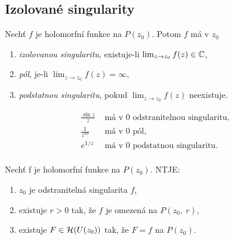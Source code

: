 \subsection{Izolované singularity}
\begin{definition}
Nechť $f$ je holomorfní funkce na $P(z_0)$. Potom $f$ má v $z_0$
\begin{enumerate}
    \item \emph{izolovanou singularitu}, existuje-li $\lim_{z\rightarrow z_0}f(z)\in\operatorname{\mathbb{C}}$,
    \item \emph{pól}, je-li $\lim_{z\rightarrow z_0}f(z)=\infty$,
    \item \emph{podstatnou singularitu}, pokud $\lim_{z\rightarrow z_0}f(z)$ neexistuje.
\end{enumerate}
\end{definition}
\begin{example}
\begin{align*}
     \frac{\sin{z}}{z}& \text{ má v 0 odstranitelnou singularitu,}\\
     \frac{1}{z^{10}}& \text{ má v 0 pól,}\\
     e^{1/z}& \text{ má v 0 podstatnou singularitu.}\\
\end{align*}
\end{example}
\begin{theorem} Nechť f je holomorfní funkce na $P(z_0)$. NTJE:
\begin{enumerate}
    \item $z_0$ je odstranitelná singularita $f$,
    \item existuje $r>0$ tak, že $f$ je omezená na $P(z_0,\ r)$,
    \item existuje $F\in \operatorname{\mathcal{H}} (U(z_0))$ tak, že $F=f$ na $P(z_0)$.
\end{enumerate}
\end{theorem}

